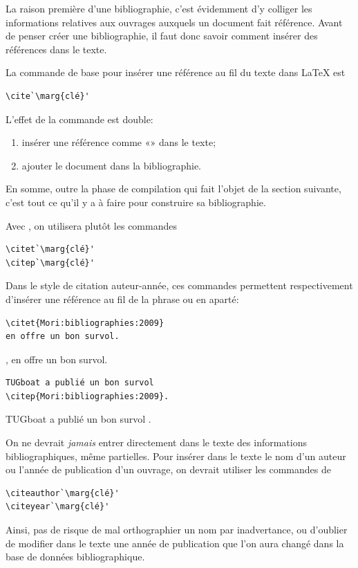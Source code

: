 La raison première d'une bibliographie, c'est évidemment d'y colliger
les informations relatives aux ouvrages auxquels un document fait
référence. Avant de penser créer une bibliographie, il faut donc
savoir comment insérer des références dans le texte.

La commande de base pour insérer une référence au fil du texte dans
{\LaTeX} est
\begin{lstlisting}
\cite`\marg{clé}'
\end{lstlisting}
L'effet de la commande est double:
\begin{enumerate}
\item insérer une référence comme «»
  dans le texte;
\item ajouter le document dans la bibliographie.
\end{enumerate}
En somme, outre la phase de compilation qui fait l'objet de la section
suivante, c'est tout ce qu'il y a à faire pour construire sa
bibliographie.

Avec , on utilisera plutôt les commandes
\begin{lstlisting}
\citet`\marg{clé}'
\citep`\marg{clé}'
\end{lstlisting}
Dans le style de citation auteur-année, ces commandes permettent
respectivement d'insérer une référence au fil de la phrase ou en
aparté:
\begin{demo}
  \begin{texample}[0.55\linewidth]
\begin{lstlisting}
\citet{Mori:bibliographies:2009}
en offre un bon survol.
\end{lstlisting}
    \producing
    \citet{Mori:bibliographies:2009},
    en offre un bon survol.
  \end{texample}
  \begin{texample}[0.55\linewidth]
\begin{lstlisting}
TUGboat a publié un bon survol
\citep{Mori:bibliographies:2009}.
\end{lstlisting}
    \producing
    TUGboat a publié un bon survol
    \citep{Mori:bibliographies:2009}.
  \end{texample}
\end{demo}

On ne devrait \emph{jamais} entrer directement dans le texte des
informations bibliographiques, même partielles. Pour insérer dans le
texte le nom d'un auteur ou l'année de publication d'un ouvrage, on
devrait utiliser les commandes de 
\begin{lstlisting}
\citeauthor`\marg{clé}'
\citeyear`\marg{clé}'
\end{lstlisting}
Ainsi, pas de risque de mal orthographier un nom par inadvertance, ou
d'oublier de modifier dans le texte une année de publication que l'on
aura changé dans la base de données bibliographique.

